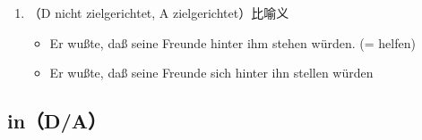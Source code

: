 \documentclass[UTF8]{report}
\begin{document}
\begin{enumerate}
\begin{enumerate}
\begin{itemize}
\begin{figure}[H]
            \end{figure}
        \end{itemize}
    \end{enumerate}
    \item （D nicht zielgerichtet, A zielgerichtet）比喻义
    \begin{itemize}
        \item Er wußte, daß seine Freunde hinter ihm stehen würden. (= helfen)
        \item Er wußte, daß seine Freunde sich hinter ihn stellen würden
    \end{itemize}
\end{enumerate}

\subsection{in（D/A）}
\end{document}
